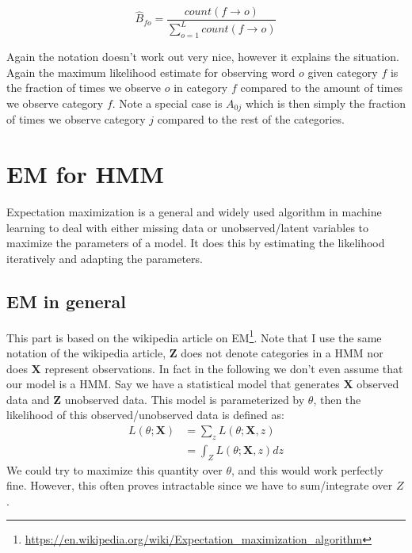 \begin{equation}
	\hat{B}_{fo} = \frac{count({f\rightarrow o})}{\sum_{o=1}^{L}count({f\rightarrow o})}
\end{equation}

Again the notation doesn't work out very nice, however it explains the situation. Again the maximum likelihood estimate for observing word $o$ given category $f$ is the fraction of times we observe $o$ in category $f$ compared to the amount of times we observe category $f$. Note a special case is $A_{0j}$ which is then simply the fraction of times we observe category $j$ compared to the rest of the categories.

\section{EM for HMM}
Expectation maximization is a general and widely used algorithm in machine learning to deal with either missing data or unobserved/latent variables to maximize the parameters of a model. It does this by estimating the likelihood iteratively and adapting the parameters.

\subsection{EM in \textbf{general}}
This part is based on the wikipedia article on EM\footnote{\url{https://en.wikipedia.org/wiki/Expectation_maximization_algorithm}}. Note that I use the same notation of the wikipedia article, $\textbf{Z}$ does not denote categories in a HMM nor does $\textbf{X}$ represent observations. In fact in the following we don't even assume that our model is a HMM.
Say we have a statistical model that generates $\textbf{X}$ observed data and $\textbf{Z}$ unobserved data. This model is parameterized by \textbf{$\theta$}, then the likelihood of this observed/unobserved data is defined as:
\begin{equation}
\begin{split}
L(\theta;\textbf{X}) &= \sum_{z} L(\theta;\textbf{X},z)\\
&= \int_{Z}L(\theta;\textbf{X},z)dz
\end{split}
\end{equation}
We could try to maximize this quantity over $\theta$, and this would work perfectly fine. However, this often proves intractable since we have to sum/integrate over $Z$.\\

